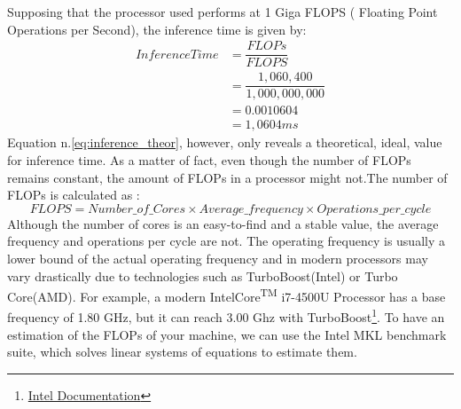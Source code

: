 Supposing that the processor used performs at 1 Giga FLOPS ( Floating Point Operations per Second), the inference time is given by:
\begin{equation}
    \begin{aligned}
InferenceTime &= \dfrac{FLOPs}{FLOPS} \\
          &= \dfrac{1,060,400}{1,000,000,000}\\
          &= 0.0010604\\
          &= 1,0604 ms
    \end{aligned}
    \label{eq:inference_theor}
\end{equation}
Equation n.\ref{eq:inference_theor}, however, only reveals a theoretical, ideal, value for inference time. As a matter of fact, even though the number of FLOPs remains constant, the amount of FLOPs in a processor might not.The number of FLOPs is calculated as :
\begin{equation}
FLOPS = Number\_of\_Cores \times Average\_frequency \times Operations\_per\_cycle
\end{equation}
Although the number of cores is an easy-to-find and a stable value, the average frequency and operations per cycle are not. The operating frequency is usually a lower bound of the actual operating frequency and in modern processors may vary drastically due to technologies such as TurboBoost(Intel) or Turbo Core(AMD). For example, a modern Intel\textregistered Core\textsuperscript{TM}  i7-4500U Processor has a base frequency of 1.80 GHz, but it can reach 3.00 Ghz with TurboBoost\footnote{
\href{https://ark.intel.com/content/www/us/en/ark/products/75460/intel-core-i74500u-processor-4m-cache-up-to-3-00-ghz.html}{Intel Documentation}}. 
To have an estimation of the FLOPs of your machine, we can use the Intel MKL benchmark suite, which solves linear systems of equations to estimate them. \cite{intel_bench_suite}

